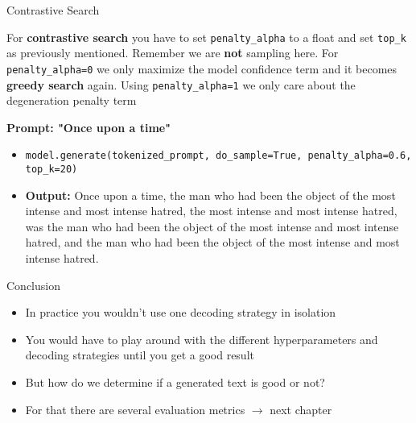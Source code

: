 
\begin{vbframe}{Contrastive Search}

\vfill

For \textbf{contrastive search} you have to set \texttt{penalty\_alpha} to a float and set \texttt{top\_k} as previously mentioned. Remember we are \textbf{not} sampling here. For \texttt{penalty\_alpha=0} we only maximize the model confidence term and it becomes \textbf{greedy search} again. Using \texttt{penalty\_alpha=1} we only care about the degeneration penalty term

\hspace{}

\textbf{Prompt: "Once upon a time"}

\begin{itemize}
    \item \texttt{model.generate(tokenized\_prompt, do\_sample=True, penalty\_alpha=0.6, top\_k=20)}
    \item \textbf{Output:} Once upon a time, the man who had been the object of the most intense and most intense hatred, the most intense and most intense hatred, was the man who had been the object of the most intense and most intense hatred, and the man who had been the object of the most intense and most intense hatred.
\end{itemize}

\vfill
    
\end{vbframe}


\begin{vbframe}{Conclusion}

\vfill

\begin{itemize}
    \item In practice you wouldn't use one decoding strategy in isolation
    \item You would have to play around with the different hyperparameters and decoding strategies until you get a good result
    \item But how do we determine if a generated text is good or not?
    \item For that there are several evaluation metrics $\rightarrow$ next chapter
\end{itemize}


\vfill
    
\end{vbframe}


\endlecture
